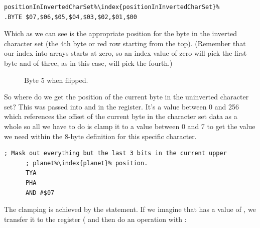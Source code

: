 \begin{lstlisting}[escapechar=\%]
positionInInvertedCharSet%\index{positionInInvertedCharSet}%      .BYTE $07,$06,$05,$04,$03,$02,$01,$00
\end{lstlisting}

Which as we can see is the appropriate position for the byte in the inverted character set (the
4th byte or red row starting from the top). (Remember that our index into arrays starts at zero,
so an index value of zero will pick the first byte and of three, as in this case, will pick the fourth.)

\begin{figure}[H]
{
  \setlength{\tabcolsep}{3.0pt}
  \setlength\cmidrulewidth{\heavyrulewidth} %
    \begin{adjustbox}{width=6cm,center}
  \begin{subfigure}{0.3\textwidth}
  
  \end{subfigure}
  \end{adjustbox}
}\caption[]{Byte 5 when flipped.}
\end{figure}

So where do we get the position of the current byte in the uninverted character set? This was
passed into  and  in the 
register. It's a value between 0 and 256 which references the offset of the current byte
in the character set data as a whole so all we have to do is clamp it to a value between 0 and 7
to get the value we need within the 8-byte definition for this specific character.

\begin{lstlisting}[escapechar=\%]
      ; Mask out everything but the last 3 bits in the current upper
      ; planet%\index{planet}% position. 
      TYA
      PHA
      AND #$07
\end{lstlisting}

The clamping is achieved by the  statement. If we imagine that  has a value of
, we transfer it to the  register ( and then do an  operation
with :

